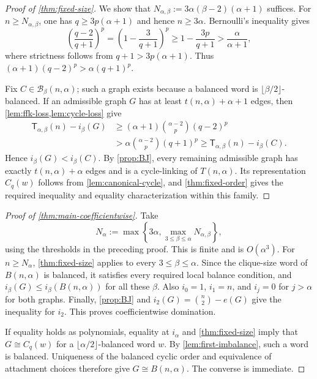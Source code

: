 \documentclass[11pt]{article}
\theoremstyle{definition}
\newcommand{\turcl}[3]{\mathsf{T}_{#1,#2}(#3)}
\begin{document}
\begin{proof}[Proof of \cref{thm:fixed-size}]
We show that $N_{\alpha,\beta}:=3\alpha(\beta-2)(\alpha+1)$ suffices.
For $n\ge N_{\alpha,\beta}$, one has $q\ge3p(\alpha+1)$ and hence
$n\ge3\alpha$. Bernoulli's inequality gives
\[
 \left(\frac{q-2}{q+1}\right)^p
 =\left(1-\frac3{q+1}\right)^p
 \ge1-\frac{3p}{q+1}>\frac{\alpha}{\alpha+1},
\]
where strictness follows from $q+1>3p(\alpha+1)$. Thus
$(\alpha+1)(q-2)^p>\alpha(q+1)^p$.

Fix $C\in\mathcal B_\beta(n,\alpha)$; such a graph exists because
a balanced word is $\lfloor\beta/2\rfloor$-balanced. If an admissible
graph $G$ has at least $t(n,\alpha)+\alpha+1$ edges, then
\cref{lem:ffk-loss,lem:cycle-loss} give
\[
 \begin{aligned}
 \turcl{\alpha}{\beta}{n}-i_\beta(G)
 &\ge(\alpha+1)\binom{\alpha-2}{p}(q-2)^p\\
 &>\alpha\binom{\alpha-2}{p}(q+1)^p
 \ge\turcl{\alpha}{\beta}{n}-i_\beta(C).
 \end{aligned}
\]
Hence $i_\beta(G)<i_\beta(C)$. By \cref{prop:BJ}, every remaining
admissible graph has exactly $t(n,\alpha)+\alpha$ edges and is a
cycle-linking of $T(n,\alpha)$. Its representation $C_q(w)$ follows
from \cref{lem:canonical-cycle}, and \cref{thm:fixed-order} gives the
required inequality and equality characterization within this family.
\end{proof}

\begin{proof}[Proof of \cref{thm:main-coefficientwise}]
Take
\[
 N_\alpha:=\max\left\{3\alpha,
                 \max_{3\le\beta\le\alpha}N_{\alpha,\beta}\right\},
\]
using the thresholds in the preceding proof. This is finite and is
$O(\alpha^3)$. For $n\ge N_\alpha$, \cref{thm:fixed-size} applies to
every $3\le\beta\le\alpha$. Since the clique-size word of
$B(n,\alpha)$ is balanced, it satisfies every required local balance
condition, and $i_\beta(G)\le i_\beta(B(n,\alpha))$ for all these
$\beta$. Also $i_0=1$, $i_1=n$, and $i_j=0$ for $j>\alpha$ for both
graphs. Finally, \cref{prop:BJ} and $i_2(G)=\binom n2-e(G)$ give the
inequality for $i_2$. This proves coefficientwise domination.

If equality holds as polynomials, equality at $i_\alpha$ and
\cref{thm:fixed-size} imply that $G\cong C_q(w)$ for a
$\lfloor\alpha/2\rfloor$-balanced word $w$. By
\cref{lem:first-imbalance}, such a word is balanced. Uniqueness of the
balanced cyclic order and equivalence of attachment choices therefore
give $G\cong B(n,\alpha)$. The converse is immediate.
\end{proof}
\end{document}
